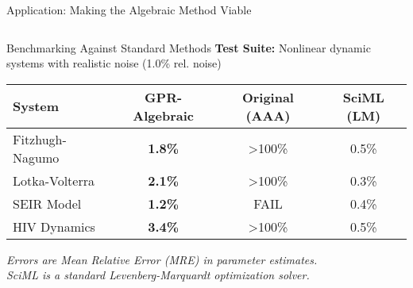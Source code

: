 \documentclass[aspectratio=169]{beamer}
\begin{document}
\begin{frame}{Application: Making the Algebraic Method Viable}
  
  \begin{columns}[t]
    
    \begin{column}{0.65\textwidth}
      \vspace{-0.5em}
      \begin{block}{\small Benchmarking Against Standard Methods}
        \tiny
        \textbf{Test Suite:} Nonlinear dynamic systems with realistic noise (1.0\% rel. noise)
        
        \vspace{0.5em}
        \centering
        \begin{tabular}{@{}lccc@{}}
          \toprule
          \textbf{System} & \textbf{GPR-Algebraic} & \textbf{Original (AAA)} & \textbf{SciML (LM)} \\
          \midrule
          Fitzhugh-Nagumo & \textcolor{successgreen}{\textbf{1.8\%}} & \textcolor{errorred}{>100\%} & 0.5\% \\
          Lotka-Volterra  & \textcolor{successgreen}{\textbf{2.1\%}} & \textcolor{errorred}{>100\%} & 0.3\% \\
          SEIR Model      & \textcolor{successgreen}{\textbf{1.2\%}} & \textcolor{errorred}{FAIL} & 0.4\% \\
          HIV Dynamics    & \textcolor{successgreen}{\textbf{3.4\%}} & \textcolor{errorred}{>100\%} & 0.5\% \\
          \bottomrule
        \end{tabular}
        
        \vspace{0.3em}
        \footnotesize
        \textit{Errors are Mean Relative Error (MRE) in parameter estimates.}\\
        \textit{SciML is a standard Levenberg-Marquardt optimization solver.}
      \end{block}
      
      \vspace{0.5em}
      \begin{center}
      \end{center}
    \end{column}
    

\end{columns}
\end{frame}
\end{document}
